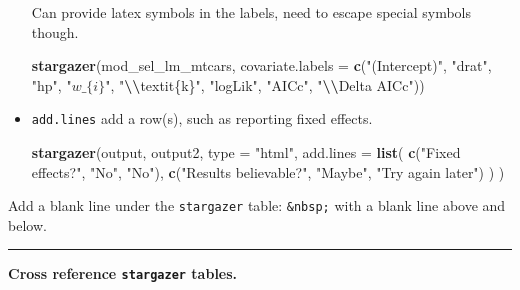 \documentclass[
  a4paper,
  twoside,
  openright]{book}
\newenvironment{Shaded}{\begin{snugshade}}{\end{snugshade}}
\newcommand{\AttributeTok}[1]{\textcolor[rgb]{0.13,0.29,0.53}{#1}}
\newcommand{\FunctionTok}[1]{\textcolor[rgb]{0.13,0.29,0.53}{\textbf{#1}}}
\newcommand{\NormalTok}[1]{#1}
\newcommand{\SpecialCharTok}[1]{\textcolor[rgb]{0.81,0.36,0.00}{\textbf{#1}}}
\newcommand{\StringTok}[1]{\textcolor[rgb]{0.31,0.60,0.02}{#1}}
\theoremstyle{definition}
\theoremstyle{definition}
\theoremstyle{definition}
\theoremstyle{definition}
\theoremstyle{remark}
\begin{document}
\begin{itemize}
  Can provide latex symbols in the labels, need to escape special symbols though.

\begin{Shaded}
\begin{Highlighting}[]
\FunctionTok{stargazer}\NormalTok{(mod\_sel\_lm\_mtcars, }
      \AttributeTok{covariate.labels =} 
        \FunctionTok{c}\NormalTok{(}\StringTok{"(Intercept)"}\NormalTok{, }\StringTok{"drat"}\NormalTok{, }\StringTok{"hp"}\NormalTok{, }\StringTok{"$w\_\{i\}$"}\NormalTok{,}
          \StringTok{"}\SpecialCharTok{\textbackslash{}\textbackslash{}}\StringTok{textit\{k\}"}\NormalTok{, }\StringTok{"logLik"}\NormalTok{, }\StringTok{"AICc"}\NormalTok{, }\StringTok{"}\SpecialCharTok{\textbackslash{}\textbackslash{}}\StringTok{Delta AICc"}\NormalTok{))}
\end{Highlighting}
\end{Shaded}
\item
  \texttt{add.lines} add a row(s), such as reporting fixed effects.

\begin{Shaded}
\begin{Highlighting}[]
\FunctionTok{stargazer}\NormalTok{(output, output2, }\AttributeTok{type =} \StringTok{"html"}\NormalTok{,}
          \AttributeTok{add.lines =} \FunctionTok{list}\NormalTok{(}
            \FunctionTok{c}\NormalTok{(}\StringTok{"Fixed effects?"}\NormalTok{, }\StringTok{"No"}\NormalTok{, }\StringTok{"No"}\NormalTok{),}
            \FunctionTok{c}\NormalTok{(}\StringTok{"Results believable?"}\NormalTok{, }\StringTok{"Maybe"}\NormalTok{, }\StringTok{"Try again later"}\NormalTok{)}
\NormalTok{            )}
\NormalTok{          )}
\end{Highlighting}
\end{Shaded}
\end{itemize}

Add a blank line under the \texttt{stargazer} table: \texttt{\&nbsp;} with a blank line above and below.

\begin{center}\rule{0.5\linewidth}{0.5pt}\end{center}

\textbf{Cross reference \texttt{stargazer} tables.}
\end{document}

